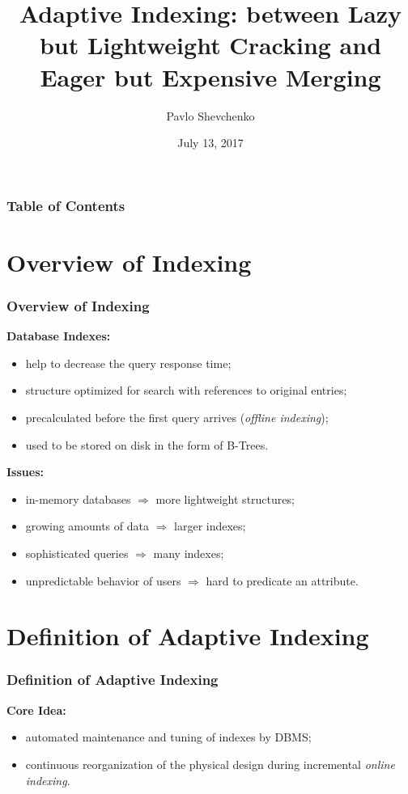 \documentclass{beamer}
\title{Adaptive Indexing: between Lazy but Lightweight Cracking and Eager but Expensive Merging}
\author{Pavlo Shevchenko}
\date{July 13, 2017}
\institute{Seminar on Modern Software Engineering and Database Concepts}
\begin{document}
\begin{frame}[plain]
 \titlepage
\end{frame}

\begin{frame}
\frametitle{Table of Contents}
\tableofcontents
\end{frame}

\section{Overview of Indexing}
\begin{frame}
\frametitle{Overview of Indexing}
\textbf{Database Indexes:}
\begin{itemize}
\item{help to decrease the query response time;}
\item{structure optimized for search with references to original entries;}
\item{precalculated before the first query arrives (\emph{offline indexing});}
\item{used to be stored on disk in the form of B-Trees.}
\end{itemize}
\pause
\textbf{Issues:}
\begin{itemize}
\item{in-memory databases $\Rightarrow$ more lightweight structures;}\pause
\item{growing amounts of data $\Rightarrow$ larger indexes;} \pause
\item{sophisticated queries $\Rightarrow$ many indexes;} \pause
\item{unpredictable behavior of users $\Rightarrow$ hard to predicate an attribute.}
\end{itemize}
\end{frame}

\section{Definition of Adaptive Indexing}
\begin{frame}
\frametitle{Definition of Adaptive Indexing}
\textbf{Core Idea:}
\begin{itemize}
\item{automated maintenance and tuning of indexes by DBMS;}
\item{continuous reorganization of the physical design during incremental \emph{online indexing}.}
\end{itemize}
\end{frame}
\end{document}
